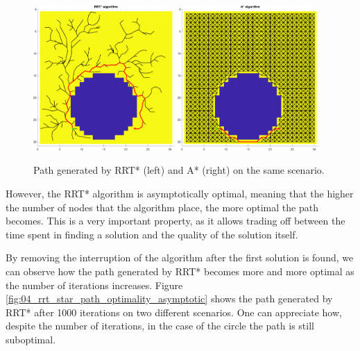 \begin{figure}[H]
    \centering
    \includegraphics[width=0.48\textwidth]{./img/MATLAB/optimality/circle_rrt_star_path_optimality.pdf}
    \includegraphics[width=0.48\textwidth]{./img/MATLAB/optimality/circle_a_star_path_optimality.pdf}
    \caption{Path generated by RRT* (left) and A* (right) on the same scenario.}
    \label{fig:circle_path_optimality}
\end{figure}

However, the RRT* algorithm is asymptotically optimal, meaning that the higher the number of nodes that the algorithm place, the more optimal the path becomes.
This is a very important property, as it allows trading off between the time spent in finding a solution and the quality of the solution itself.

By removing the interruption of the algorithm after the first solution is found, we can observe how the path generated by RRT* becomes more and more optimal as the number of iterations increases.
Figure \ref{fig:04_rrt_star_path_optimality_asymptotic} shows the path generated by RRT* after 1000 iterations on two different scenarios.
One can appreciate how, despite the number of iterations, in the case of the circle the path is still suboptimal.

